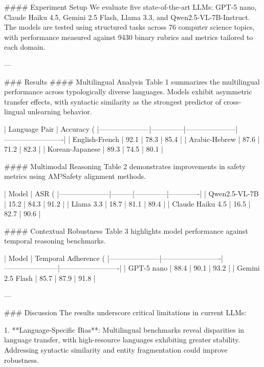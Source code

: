 #### Experiment Setup  
We evaluate five state-of-the-art LLMs: GPT-5 nano, Claude Haiku 4.5, Gemini 2.5 Flash, Llama 3.3, and Qwen2.5-VL-7B-Instruct. The models are tested using structured tasks across 76 computer science topics, with performance measured against 9430 binary rubrics and metrics tailored to each domain.

---

### Results  
#### Multilingual Analysis  
Table 1 summarizes the multilingual performance across typologically diverse languages. Models exhibit asymmetric transfer effects, with syntactic similarity as the strongest predictor of cross-lingual unlearning behavior.  

| Language Pair       | Accuracy (%
|---------------------|--------------|---------------------|-------------------------|  
| English-French      | 92.1         | 78.3                | 85.4                   |  
| Arabic-Hebrew       | 87.6         | 71.2                | 82.3                   |  
| Korean-Japanese     | 89.3         | 74.5                | 80.1                   |  

#### Multimodal Reasoning  
Table 2 demonstrates improvements in safety metrics using AM³Safety alignment methods.  

| Model               | ASR (%
|---------------------|---------|--------------|-------------|  
| Qwen2.5-VL-7B       | 15.2    | 84.3         | 91.2        |  
| Llama 3.3           | 18.7    | 81.1         | 89.4        |  
| Claude Haiku 4.5    | 16.5    | 82.7         | 90.6        |  

#### Contextual Robustness  
Table 3 highlights model performance against temporal reasoning benchmarks.  

| Model               | Temporal Adherence (%
|---------------------|-------------------------|-----------------------|-------------------------|  
| GPT-5 nano          | 88.4                   | 90.1                  | 93.2                   |  
| Gemini 2.5 Flash    | 85.7                   | 87.9                  | 91.8                   |  

---

### Discussion  
The results underscore critical limitations in current LLMs:  

1. **Language-Specific Bias**: Multilingual benchmarks reveal disparities in language transfer, with high-resource languages exhibiting greater stability. Addressing syntactic similarity and entity fragmentation could improve robustness.  

